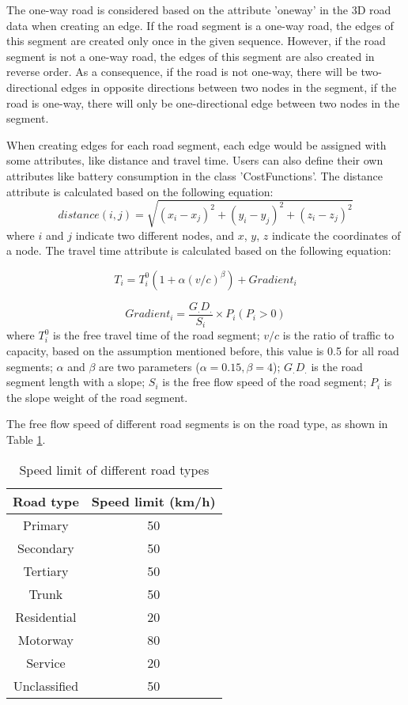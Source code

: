 \documentclass[final-report]{report-template}
\begin{document}
The one-way road is considered based on the attribute 'oneway' in the 3D road data when creating an edge.
If the road segment is a one-way road, the edges of this segment are created only once in the given sequence. 
However, if the road segment is not a one-way road, the edges of this segment are also created in reverse order.
As a consequence, if the road is not one-way, there will be two-directional edges in opposite directions between two nodes in the segment,
if the road is one-way, there will only be one-directional edge between two nodes in the segment.

When creating edges for each road segment, each edge would be assigned with some attributes, like distance and travel time.
Users can also define their own attributes like battery consumption in the class 'CostFunctions'. 
The distance attribute is calculated based on the following equation:
\begin{equation}
    distance(i,j) = \sqrt{(x_i-x_j)^2 + (y_i-y_j)^2 + (z_i-z_j)^2}
\end{equation}
where $i$ and $j$ indicate two different nodes, and $x$, $y$, $z$ indicate the coordinates of a node.
The travel time attribute is calculated based on the following equation:

\begin{equation}
    T_i = T_i^0(1+\alpha(v/c)^\beta)+Gradient_i
\end{equation}

\begin{equation}
    Gradient_i = \frac{G_.D_.}{S_i} \times P_i(P_i>0)
\end{equation}
where $T_i^0$ is the free travel time of the road segment; 
$v/c$ is the ratio of traffic to capacity, based on the assumption mentioned before, this value is 0.5 for all road segments;
$\alpha$ and $\beta$ are two parameters ($\alpha=0.15, \beta=4$); $G_.D_.$ is the road segment length with a slope;
$S_i$ is the free flow speed of the road segment; $P_i$ is the slope weight of the road segment. 

The free flow speed of different road segments is on the road type, as shown in Table \ref{tab:speed_limit}.
\begin{table}[H]
    \centering
    \begin{tabular}{|c|c|}
    \hline
    Road type & Speed limit (km/h) \\
    \hline
    Primary & 50 \\
    Secondary & 50 \\
    Tertiary & 50 \\
    Trunk & 50 \\
    Residential & 20 \\
    Motorway & 80 \\
    Service & 20 \\
    Unclassified & 50 \\
    \hline
    \end{tabular}
    \caption{\label{tab:speed_limit}Speed limit of different road types}
\end{table}
    
\end{document}
